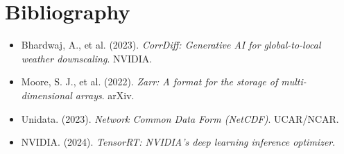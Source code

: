 \section*{Bibliography}
\begin{itemize}
    \item Bhardwaj, A., et al. (2023). \textit{CorrDiff: Generative AI for global-to-local weather downscaling}. NVIDIA.
    \item Moore, S. J., et al. (2022). \textit{Zarr: A format for the storage of multi-dimensional arrays}. arXiv.
    \item Unidata. (2023). \textit{Network Common Data Form (NetCDF)}. UCAR/NCAR.
    \item NVIDIA. (2024). \textit{TensorRT: NVIDIA's deep learning inference optimizer}.
\end{itemize}
